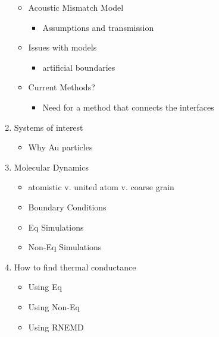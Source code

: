 \begin{enumerate}
\begin{itemize}
\begin{itemize}
    	\end{itemize}
	\item Acoustic Mismatch Model
    \begin{itemize}
    \item Assumptions and transmission
    \end{itemize}
	\item Issues with models
    \begin{itemize}
    \item artificial boundaries
    \end{itemize}
	\item Current Methods?
    \begin{itemize}
    \item Need for a method that connects the interfaces
    \end{itemize}
	\end{itemize}
\item Systems of interest
	\begin{itemize}
	\item Why Au particles
	\end{itemize}
\item Molecular Dynamics
	\begin{itemize}
    \item atomistic v. united atom v. coarse grain
	\item Boundary Conditions
    \item Eq Simulations
    \item Non-Eq Simulations
	\end{itemize}
\item How to find thermal conductance
	\begin{itemize}
	\item Using Eq
    \item Using Non-Eq
    \item Using RNEMD
	\end{itemize}
\end{enumerate}

